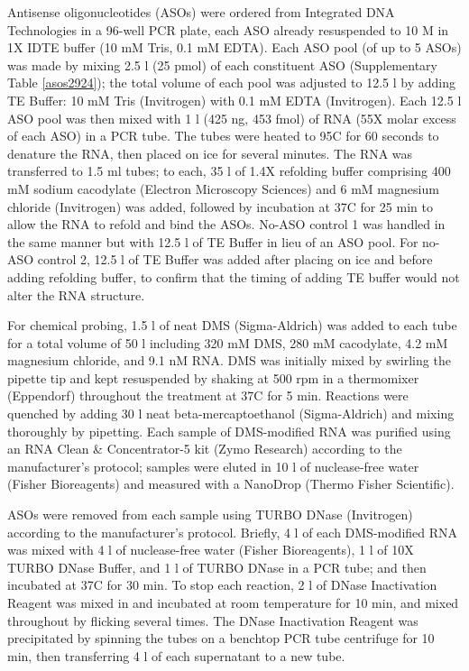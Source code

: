 \documentclass[main.tex]{subfiles}
\begin{document}
Antisense oligonucleotides (ASOs) were ordered from Integrated DNA Technologies in a 96-well PCR plate, each ASO already resuspended to 10 \textmu M in 1X IDTE buffer (10 mM Tris, 0.1 mM EDTA).
Each ASO pool (of up to 5 ASOs) was made by mixing 2.5 \textmu l (25 pmol) of each constituent ASO (Supplementary Table \ref{asos2924}); the total volume of each pool was adjusted to 12.5 \textmu l by adding TE Buffer: 10 mM Tris (Invitrogen) with 0.1 mM EDTA (Invitrogen).
Each 12.5 \textmu l ASO pool was then mixed with 1 \textmu l (425 ng, 453 fmol) of RNA (55X molar excess of each ASO) in a PCR tube.
The tubes were heated to 95\textdegree C for 60 seconds to denature the RNA, then placed on ice for several minutes.
The RNA was transferred to 1.5 ml tubes; to each, 35 \textmu l of 1.4X refolding buffer comprising 400 mM sodium cacodylate (Electron Microscopy Sciences) and 6 mM magnesium chloride (Invitrogen) was added, followed by incubation at 37\textdegree C for 25 min to allow the RNA to refold and bind the ASOs.
No-ASO control 1 was handled in the same manner but with 12.5 \textmu l of TE Buffer in lieu of an ASO pool.
For no-ASO control 2, 12.5 \textmu l of TE Buffer was added after placing on ice and before adding refolding buffer, to confirm that the timing of adding TE buffer would not alter the RNA structure.

For chemical probing, 1.5 \textmu l of neat DMS (Sigma-Aldrich) was added to each tube for a total volume of 50 \textmu l including 320 mM DMS, 280 mM cacodylate, 4.2 mM magnesium chloride, and 9.1 nM RNA.
DMS was initially mixed by swirling the pipette tip and kept resuspended by shaking at 500 rpm in a thermomixer (Eppendorf) throughout the treatment at 37\textdegree C for 5 min.
Reactions were quenched by adding 30 \textmu l neat beta-mercaptoethanol (Sigma-Aldrich) and mixing thoroughly by pipetting.
Each sample of DMS-modified RNA was purified using an RNA Clean \& Concentrator-5 kit (Zymo Research) according to the manufacturer's protocol; samples were eluted in 10 \textmu l of nuclease-free water (Fisher Bioreagents) and measured with a NanoDrop (Thermo Fisher Scientific).

ASOs were removed from each sample using TURBO DNase (Invitrogen) according to the manufacturer's protocol.
Briefly, 4 \textmu l of each DMS-modified RNA was mixed with 4 \textmu l of nuclease-free water (Fisher Bioreagents), 1 \textmu l of 10X TURBO DNase Buffer, and 1 \textmu l of TURBO DNase in a PCR tube; and then incubated at 37\textdegree C for 30 min.
To stop each reaction, 2 \textmu l of DNase Inactivation Reagent was mixed in and incubated at room temperature for 10 min, and mixed throughout by flicking several times.
The DNase Inactivation Reagent was precipitated by spinning the tubes on a benchtop PCR tube centrifuge for 10 min, then transferring 4 \textmu l of each supernatant to a new tube.
\end{document}
